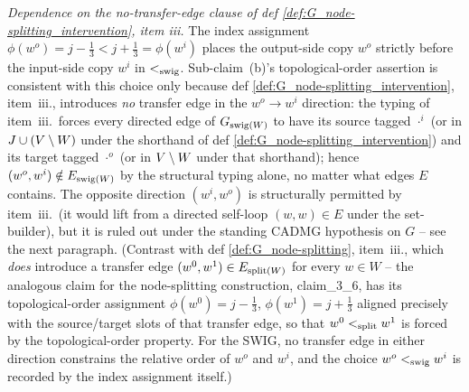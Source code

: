 \documentclass[main]{subfiles}
\begin{document}
\begin{Rem}[SwigAcyclic]
    \emph{Dependence on the no-transfer-edge clause of def \ref{def:G_node-splitting_intervention}, item iii.}
    The index assignment $\phi(w^o) = j - \tfrac{1}{3} < j + \tfrac{1}{3} = \phi(w^i)$ places the output-side copy $w^o$ strictly before the input-side copy $w^i$ in $<_{\mathrm{swig}}$. Sub-claim~(b)'s topological-order assertion is consistent with this choice only because def \ref{def:G_node-splitting_intervention}, item~iii., introduces \emph{no} transfer edge in the $w^o \to w^i$ direction: the typing of item~iii.\ forces every directed edge of $G_{\mathrm{swig}(W)}$ to have its source tagged $\cdot^i$ (or in $J \cup (V \setminus W)$ under the shorthand of def \ref{def:G_node-splitting_intervention}) and its target tagged $\cdot^o$ (or in $V \setminus W$ under that shorthand); hence $(w^o, w^i) \notin E_{\mathrm{swig}(W)}$ by the structural typing alone, no matter what edges $E$ contains. The opposite direction $(w^i, w^o)$ is structurally permitted by item~iii.\ (it would lift from a directed self-loop $(w, w) \in E$ under the set-builder), but it is ruled out under the standing CADMG hypothesis on $G$ -- see the next paragraph. (Contrast with def \ref{def:G_node-splitting}, item~iii., which \emph{does} introduce a transfer edge $(w^0, w^1) \in E_{\mathrm{split}(W)}$ for every $w \in W$ -- the analogous claim for the node-splitting construction, claim_3_6, has its topological-order assignment $\phi(w^0) = j - \tfrac{1}{3}$, $\phi(w^1) = j + \tfrac{1}{3}$ aligned precisely with the source/target slots of that transfer edge, so that $w^0 <_{\mathrm{split}} w^1$ is forced by the topological-order property. For the SWIG, no transfer edge in either direction constrains the relative order of $w^o$ and $w^i$, and the choice $w^o <_{\mathrm{swig}} w^i$ is recorded by the index assignment itself.)


\end{Rem}
\end{document}
